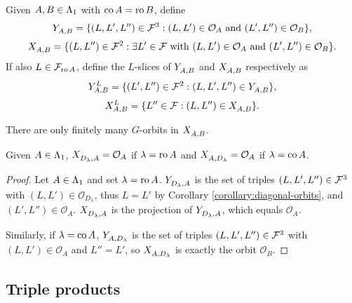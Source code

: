 \documentclass[a4paper, 11pt]{report}
\begin{document}
Given $A,B\in\matrices$ with $\co{A}=\ro{B}$, define
\begin{equation*}
\yprod{A,B} = \{ (L,L',L'')\in\flags^3: (L,L')\in\mathcal{O}_A \text{ and } (L',L'')\in\mathcal{O}_B\},
\end{equation*}
\begin{equation*}
\xprod{A,B} = \{(L,L'')\in\flags^2:\exists L'\in\flags\text{ with } (L,L')\in\mathcal{O}_A \text{ and } (L',L'')\in\mathcal{O}_B\}.
\end{equation*}
If also $L\in\flags_{\ro{A}}$, define the $L$-slices of $\yprod{A,B}$ and $\xprod{A,B}$ respectively as
\begin{equation*}
\yprod[L]{A,B} = \{(L',L'')\in\flags^2: (L,L',L'')\in\yprod{A,B}\},
\end{equation*}
\begin{equation*}
\xprod[L]{A,B} = \{L''\in\flags: (L,L'')\in\xprod{A,B}\}.
\end{equation*}

\begin{observation}
There are only finitely many $G$-orbits in $\xprod{A,B}$.
\end{observation}

\begin{lemma}\label{lemma:product-with-diagonal-orbits}
Given $A\in\matrices$, $\xprod{D_\lambda,A}=\mathcal{O}_A$ if $\lambda=\ro{A}$ and $\xprod{A,D_\lambda}=\mathcal{O}_A$ if $\lambda=\co{A}$.
\end{lemma}

\begin{proof}
Let $A\in\matrices$ and set $\lambda=\ro{A}$. $\yprod{D_\lambda,A}$ is the set of triples $(L,L',L'')\in\flags^3$ with $(L,L')\in\mathcal{O}_{D_\lambda}$, thus $L=L'$ by Corollary \ref{corollary:diagonal-orbits}, and $(L',L'')\in\mathcal{O}_A$. $\xprod{D_\lambda,A}$ is the projection of $\yprod{D_\lambda,A}$, which equals $\mathcal{O}_A$.

Similarly, if $\lambda=\co{A}$, $\yprod{A,D_\lambda}$ is the set of triples $(L,L',L'')\in\flags^3$ with $(L,L')\in\mathcal{O}_A$ and $L''=L'$, so $\xprod{A,D_\lambda}$ is exactly the orbit $\mathcal{O}_B$.
\end{proof}

\subsection{Triple products}\label{sec:triple-product}
\end{document}
